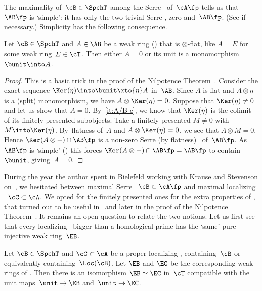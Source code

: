 \begin{Rem}
\label{Rem:simple}
The maximality of~$\cB\in\SpchT$ among the Serre \tensids\ of~$\cA\fp$ tells us that $\AB\fp$ is `simple': it has only the two trivial Serre \tensids, zero and~$\AB\fp$. (See  if necessary.) Simplicity has the following consequence.
\end{Rem}

\begin{Prop}
\label{Prop:ring-in-AB}
Let $\cB\in\SpchT$ and $A\in\AB$ be a weak ring () that is $\otimes$-flat, like $A=\bar E$ for some weak ring~$E\in\cT$. Then either $A=0$ or its unit is a monomorphism $\bunit\into A$.
\end{Prop}

\begin{proof}
This is a basic trick in the proof of the Nilpotence Theorem~\cite{Balmer20a}. Consider the exact sequence $\Ker(\eta)\into \bunit\xto{\eta} A$ in~$\AB$. Since $A$ is flat and $A\otimes\eta$ is a (split) monomorphism, we have $A\otimes\Ker(\eta)=0$. Suppose that $\Ker(\eta)\neq0$ and let us show that $A=0$. By \,\eqref{it:A/B-c}, we know that $\Ker(\eta)$ is the colimit of its finitely presented subobjects. Take a finitely presented $M\neq0$ with $M\into \Ker(\eta)$. By~flatness of~$A$ and $A\otimes\Ker(\eta)=0$, we see that $A\otimes M=0$. Hence $\Ker(A\otimes-)\cap \AB\fp$ is a non-zero Serre (by flatness) \tensid\ of~$\AB\fp$. As $\AB\fp$ is `simple' () this forces $\Ker(A\otimes-)\cap \AB\fp=\AB\fp$ to contain~$\bunit$, giving~$A=0$.
\end{proof}

\begin{Rem}
\label{Rem:max-vs-max}
During the year the author spent in Bielefeld working with Krause and Stevenson on~\cite{BalmerKrauseStevenson19}, we hesitated between maximal Serre \tensids\ $\cB\subset\cA\fp$ and maximal localizing \tensids\ $\cC\subset\cA$. We opted for the finitely presented ones for the extra properties of , that turned out to be useful in~\cite{BalmerKrauseStevenson19} and later in the proof of the Nilpotence Theorem~\cite{Balmer20a}. It remains an open question to relate the two notions. Let us first see that every localizing \tensid\ bigger than a homological prime has the `same' pure-injective weak ring~$\EB$.
\end{Rem}

\begin{Prop}
\label{Prop:EB=EC}
Let $\cB\in\SpchT$ and $\cC\subset\cA$ be a proper localizing \tensid, containing~$\cB$ or equivalently containing~$\Loc(\cB)$. Let $\EB$ and $\EC$ be the corresponding weak rings of . Then there is an isomorphism $\EB\simeq \EC$ in~$\cT$ compatible with the unit maps~$\unit\to\EB$ and~$\unit\to \EC$.
\end{Prop}


